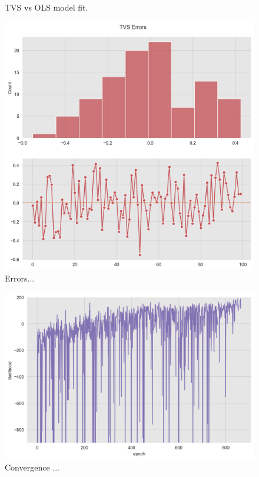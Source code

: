 \documentclass[11pt]{amsart}
\begin{document}
\begin{center}
\begin{figure}
\caption{TVS vs OLS model fit.}
\label{fig:tvs_ols_fit}
\end{figure}
\end{center}

\begin{center}
\begin{figure}
\includegraphics[scale=0.5]{images/tvs_errors.png}
\caption{Errors...}
\label{fig:tvs_errors}
\end{figure}
\end{center}

\begin{center}
\begin{figure}
\includegraphics[scale=0.6]{images/convergence.png} 
\caption{Convergence ...}
\label{fig:convergence}
\end{figure}
\end{center}
\end{document}
